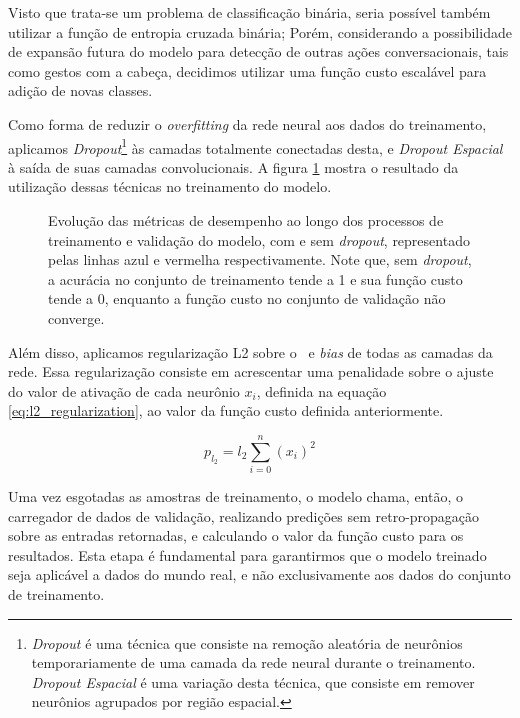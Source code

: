 Visto que trata-se um problema de classificação binária, seria possível também utilizar a função de entropia cruzada binária; Porém, considerando a possibilidade de expansão futura do modelo para detecção de outras ações conversacionais, tais como gestos com a cabeça, decidimos utilizar uma função custo escalável para adição de novas classes.

Como forma de reduzir o \textit{overfitting} da rede neural aos dados do treinamento, aplicamos \textit{Dropout}\footnote{\textit{Dropout} é uma técnica que consiste na remoção aleatória de neurônios temporariamente de uma camada da rede neural durante o treinamento. \textit{Dropout Espacial} é uma variação desta técnica, que consiste em remover neurônios agrupados por região espacial.} às camadas totalmente conectadas desta, e \textit{Dropout Espacial} à saída de suas camadas convolucionais.
A figura \ref{fig:training_metrics} mostra o resultado da utilização dessas técnicas no treinamento do modelo.

\begin{figure}[ht]
    \centering
    \resizebox{0.95\textwidth}{!}{
        
    }
    \caption{Evolução das métricas de desempenho ao longo dos processos de treinamento e validação do modelo, com e sem \textit{dropout}, representado pelas linhas azul e vermelha respectivamente. Note que, sem \textit{dropout}, a acurácia no conjunto de treinamento tende a 1 e sua função custo tende a 0, enquanto a função custo no conjunto de validação não converge. }
    \label{fig:training_metrics}
\end{figure}

Além disso, aplicamos regularização L2 sobre o \ e \textit{bias} de todas as camadas da rede.
Essa regularização consiste em acrescentar uma penalidade sobre o ajuste do valor de ativação de cada neurônio $x_i$, definida na equação \ref{eq:l2_regularization}, ao valor da função custo definida anteriormente.

\begin{equation}\label{eq:l2_regularization}
    p_{l_2} = l_2 \sum\limits_{i=0}^n(x_i)^2
\end{equation}

Uma vez esgotadas as amostras de treinamento, o modelo chama, então, o carregador de dados de validação, realizando predições sem retro-propagação sobre as entradas retornadas, e calculando o valor da função custo para os resultados.
Esta etapa é fundamental para garantirmos que o modelo treinado seja aplicável a dados do mundo real, e não exclusivamente aos dados do conjunto de treinamento.

